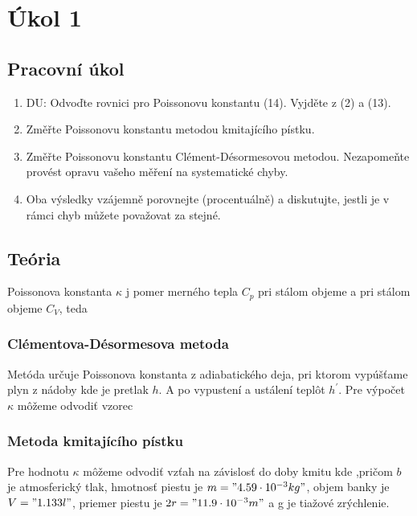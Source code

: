 \documentclass[10pt]{scrartcl}
\begin{document}
\MakeFJFIHead{}

\section{Úkol 1}
\subsection{Pracovní úkol}

\begin{enumerate}
\item DU: Odvoďte rovnici pro Poissonovu konstantu (14)\cite{1}. Vyjděte z (2)\cite{1} a (13)\cite{1}.
\item Změřte Poissonovu konstantu metodou kmitajícího pístku.
\item Změřte Poissonovu konstantu Clément-Désormesovou metodou. Nezapomeňte provést opravu vašeho měření na systematické chyby.
\item Oba výsledky vzájemně porovnejte (procentuálně) a diskutujte, jestli je v rámci chyb můžete považovat za stejné.
\end{enumerate}

\subsection{Teória}
Poissonova konstanta $\kappa$ j pomer merného tepla $C_p$ pri stálom objeme a pri stálom objeme $C_V$, teda 

\subsubsection{ Clémentova-Désormesova metoda}
Metóda určuje Poissonova konstanta z adiabatického deja, pri ktorom vypúšťame plyn z nádoby kde je pretlak $h$. A po vypustení a ustálení teplôt $h^\prime$.
Pre výpočet $\kappa$ môžeme odvodiť vzorec

\subsubsection{Metoda kmitajícího pístku}
Pre hodnotu $\kappa$ môžeme odvodiť vzťah na závislosť do doby kmitu
kde
,pričom $b$ je atmosferický tlak, hmotnosť piestu je $m="4.59\cdot10^{-3} kg"$, objem banky je $V="1.133 l"$, priemer piestu je $2r = "11.9\cdot10^{-3} m"$ a g je tiažové zrýchlenie.
\end{document}
